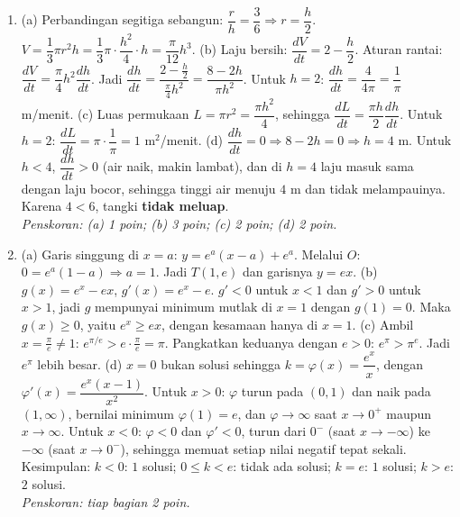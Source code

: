 \documentclass[a4paper,11pt]{article}
\newcommand{\dd}[2]{\dfrac{d#1}{d#2}}
\begin{document}
\begin{enumerate}[leftmargin=2em,itemsep=3pt,topsep=2pt]
\item[\textbf{4.}] (a) Perbandingan segitiga sebangun: $\dfrac rh=\dfrac36\Rightarrow r=\dfrac h2$. $V=\dfrac13\pi r^2h=\dfrac13\pi\cdot\dfrac{h^2}4\cdot h=\dfrac\pi{12}h^3$. (b) Laju bersih: $\dd Vt=2-\dfrac h2$. Aturan rantai: $\dd Vt=\dfrac\pi4h^2\dd ht$. Jadi $\dd ht=\dfrac{2-\frac h2}{\frac\pi4h^2}=\dfrac{8-2h}{\pi h^2}$. Untuk $h=2$: $\dd ht=\dfrac{4}{4\pi}=\dfrac1\pi$ m/menit. (c) Luas permukaan $L=\pi r^2=\dfrac{\pi h^2}4$, sehingga $\dd Lt=\dfrac{\pi h}2\dd ht$. Untuk $h=2$: $\dd Lt=\pi\cdot\dfrac1\pi=1$ m$^2$/menit. (d) $\dd ht=0\Rightarrow8-2h=0\Rightarrow h=4$ m. Untuk $h<4$, $\dd ht>0$ (air naik, makin lambat), dan di $h=4$ laju masuk sama dengan laju bocor, sehingga tinggi air menuju $4$ m dan tidak melampauinya. Karena $4<6$, tangki \textbf{tidak meluap}. \\ \textit{Penskoran: (a) 1 poin; (b) 3 poin; (c) 2 poin; (d) 2 poin.}
\item[\textbf{5.}] (a) Garis singgung di $x=a$: $y=e^a(x-a)+e^a$. Melalui $O$: $0=e^a(1-a)\Rightarrow a=1$. Jadi $T(1,e)$ dan garisnya $y=ex$. (b) $g(x)=e^x-ex$, $g'(x)=e^x-e$. $g'<0$ untuk $x<1$ dan $g'>0$ untuk $x>1$, jadi $g$ mempunyai minimum mutlak di $x=1$ dengan $g(1)=0$. Maka $g(x)\ge0$, yaitu $e^x\ge ex$, dengan kesamaan hanya di $x=1$. (c) Ambil $x=\frac\pi e\ne1$: $e^{\pi/e}>e\cdot\frac\pi e=\pi$. Pangkatkan keduanya dengan $e>0$: $e^\pi>\pi^e$. Jadi $e^\pi$ lebih besar. (d) $x=0$ bukan solusi sehingga $k=\varphi(x)=\dfrac{e^x}x$, dengan $\varphi'(x)=\dfrac{e^x(x-1)}{x^2}$. Untuk $x>0$: $\varphi$ turun pada $(0,1)$ dan naik pada $(1,\infty)$, bernilai minimum $\varphi(1)=e$, dan $\varphi\to\infty$ saat $x\to0^+$ maupun $x\to\infty$. Untuk $x<0$: $\varphi<0$ dan $\varphi'<0$, turun dari $0^-$ (saat $x\to-\infty$) ke $-\infty$ (saat $x\to0^-$), sehingga memuat setiap nilai negatif tepat sekali. Kesimpulan: $k<0$: $1$ solusi; $0\le k<e$: tidak ada solusi; $k=e$: $1$ solusi; $k>e$: $2$ solusi. \\ \textit{Penskoran: tiap bagian 2 poin.}
\end{enumerate}
\end{document}
